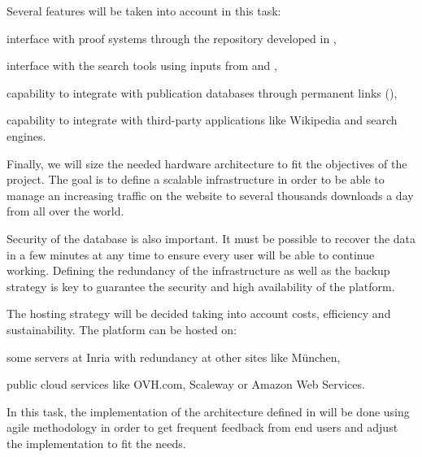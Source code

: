 \begin{workpackage}[id=access,type=RTD,wphases=1-48,
  short=Access,%
  title={Access},
  lead=Inr,InrRM=54,OcaRM=6]
\begin{tasklist}
\begin{task}[id=archi,
      title=Setting up the hardware and software architecture,
      shorttitle=Archi.,
      lead=Inr,InrRM=6,wphases=1-6]
    Several features will be taken into account in this task:
    \begin{compactitem}
    \item interface with proof systems through the repository developed
      in ,
    \item interface with the search tools using inputs from
       and ,
    \item capability to integrate with publication databases through
      permanent links (),
    \item capability to integrate with third-party applications like
      Wikipedia and search engines.
    \end{compactitem}

    Finally, we will size the needed hardware architecture to fit the
    objectives of the project. The goal is to define a scalable
    infrastructure in order to be able to manage an increasing traffic
    on the website to several thousands downloads a day from all over
    the world.

    Security of the database is also important. It must be possible to
    recover the data in a few minutes at any time to ensure every user
    will be able to continue working. Defining the redundancy of the
    infrastructure as well as the backup strategy is key to guarantee
    the security and high availability of the platform.

    The hosting strategy will be decided taking into account costs,
    efficiency and sustainability. The platform can be hosted on:
    \begin{compactitem}
    \item some servers at Inria with redundancy at other
      sites like München,
    \item public cloud services like OVH.com, Scaleway or Amazon
      Web Services.
    \end{compactitem}
  \end{task}

  \begin{task}[id=web,
      title=Giving access to the infrastructure on the world-wide web,
      shorttitle=Web,
      lead=Inr,InrRM=12,wphases=7-18]
    In this task, the implementation of the architecture defined in
     will be done using agile methodology in
    order to get frequent feedback from end users and adjust the
    implementation to fit the needs.


\end{task}
\end{tasklist}
\end{workpackage}
